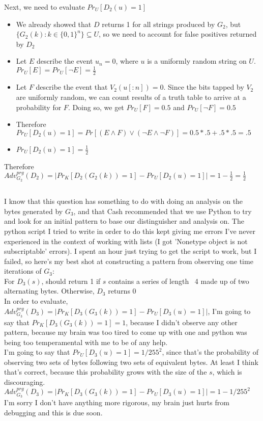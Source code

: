 \documentclass[]{article}
\begin{document}
Next, we need to evaluate $Pr_U[D_2(u) = 1]$
\begin{itemize}
	\item We already showed that $D$ returns 1 for all strings produced by $G_2$, but $\{G_2(k): k \in \{0,1\}^n\} \subseteq U$, so we need to account for false positives returned by $D_2$
	\item Let $E$ describe the event $u_{n} = 0$, where $u$ is a uniformly random string on $U$. $Pr_U[E] = Pr_U[\lnot E] = \frac{1}{2}$
	\item Let $F$ describe the event that $V_2(u[:n]) = 0$. Since the bits tapped by $V_2$ are uniformly random, we can count results of a truth table to arrive at a probability for $F$. Doing so, we get $Pr_U[F] = 0.5$ and $Pr_U[\lnot F] = 0.5$
	\item Therefore $Pr_U[D_2(u) = 1] = Pr[(E \land F) \lor (\lnot E \land \lnot F)] = 0.5 * .5 + .5 * .5 = .5$
	\item $Pr_U[D_2(u) = 1] = \frac{1}{2}$
\end{itemize}
Therefore $Adv^{prg}_{G_2}(D_2) = |Pr_K[D_2(G_2(k)) = 1] - Pr_U[D_2(u)=1]| = 1 - \frac{1}{2} = \frac{1}{2}$

\subsection{}
I know that this question has something to do with doing an analysis on the bytes generated by $G_3$, and that Cash recommended that we use Python to try and look for an initial pattern to base our distinguisher and analysis on. The python script I tried to write in order to do this kept giving me errors I've never experienced in the context of working with lists (I got 'Nonetype object is not subscriptable' errors). I spent an hour just trying to get the script to work, but I failed, so here's my best shot at constructing a pattern from observing one time iterations of $G_3$:
\\
For $D_3(s)$, should return 1 if $s$ contains a series of length ~4 made up of two alternating bytes. Otherwise, $D_3$ returns 0
\\
In order to evaluate, $Adv^{prg}_{G_3}(D_3) = |Pr_K[D_3(G_3(k)) = 1] - Pr_U[D_3(u)=1]|$, I'm going to say that $Pr_K[D_3(G_3(k)) = 1] = 1$, because I didn't observe any other pattern, because my brain was too tired to come up with one and python was being too temperamental with me to be of any help.
\\
I'm going to say that $Pr_U[D_3(u)=1] = 1/255^2$, since that's the probability of observing two sets of bytes following two sets of equivalent bytes. At least I think that's correct, because this probability grows with the size of the $s$, which is discouraging.
\\
$Adv^{prg}_{G_3}(D_3) = |Pr_K[D_3(G_3(k)) = 1] - Pr_U[D_3(u)=1]| = 1 - 1/255^2$
\\
I'm sorry I don't have anything more rigorous, my brain just hurts from debugging and this is due soon.
\end{document}
